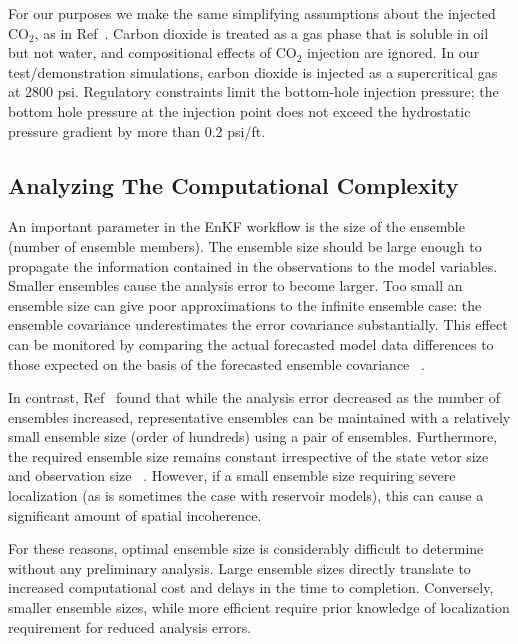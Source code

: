 \documentclass{rspublic}
\begin{document}
For our purposes we make the same simplifying assumptions about the
injected CO$_2$, as in Ref~\cite{Pawar}. Carbon dioxide is treated as
a gas phase that is soluble in oil but not water, and compositional
effects of CO$_2$ injection are ignored. In our test/demonstration
simulations, carbon dioxide is injected as a supercritical gas at 2800
psi. Regulatory constraints limit the bottom-hole injection pressure;
the bottom hole pressure at the injection point does not exceed the
hydrostatic pressure gradient by more than 0.2 psi/ft.

\subsection{Analyzing The Computational Complexity}



An important parameter in the EnKF workflow is the size of the
ensemble (number of ensemble members). The ensemble size should be
large enough to propagate the information contained in the
observations to the model variables. Smaller ensembles cause the
analysis error to become larger. Too small an ensemble size can give
poor approximations to the infinite ensemble case: the ensemble
covariance underestimates the error covariance substantially. This
effect can be monitored by comparing the actual forecasted model data
differences to those expected on the basis of the forecasted ensemble
covariance ~\cite{Burger98}.

In contrast, Ref~\cite{Hout98} found that while the analysis error
decreased as the number of ensembles increased, representative
ensembles can be maintained with a relatively small ensemble size
(order of hundreds) using a pair of ensembles. Furthermore, the
required ensemble size remains constant irrespective of the state
vetor size and observation size ~\cite{Mitchell02}. However, if a
small ensemble size requiring severe localization (as is sometimes the
case with reservoir models), this can cause a significant amount of
spatial incoherence.


For these reasons, optimal ensemble size is considerably difficult to
determine without any preliminary analysis. Large ensemble sizes
directly translate to increased computational cost and delays in the
time to completion. Conversely, smaller ensemble sizes, while more
efficient require prior knowledge of localization requirement for
reduced analysis errors.
\end{document}
